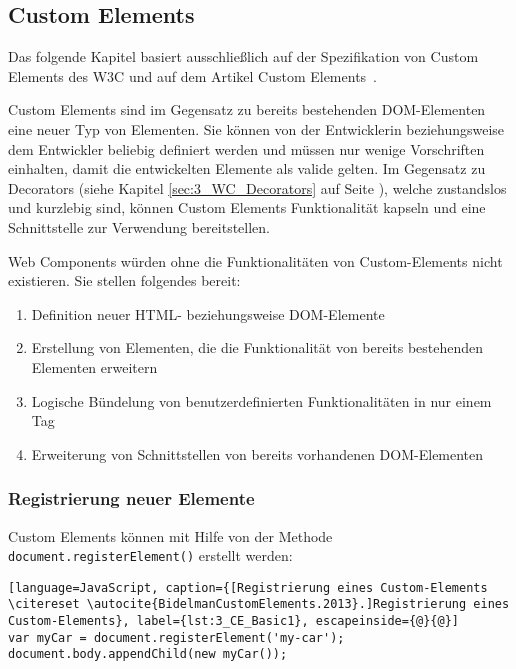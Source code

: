 \subsection{Custom Elements}
\label{sec:3_WC_Elements}

Das folgende Kapitel basiert ausschließlich auf der Spezifikation von Custom Elements des W3C \citereset \autocite[siehe][]{Glakov.2013} und auf dem Artikel \glqq Custom Elements\grqq\ \citereset \autocite[siehe][]{BidelmanCustomElements.2013}.

Custom Elements sind im Gegensatz zu bereits bestehenden DOM-Elementen eine neuer Typ von Elementen. Sie können von der Entwicklerin beziehungsweise dem Entwickler beliebig definiert werden und müssen nur wenige Vorschriften einhalten, damit die entwickelten Elemente als valide gelten. Im Gegensatz zu Decorators (siehe Kapitel \ref{sec:3_WC_Decorators} auf Seite \pageref{sec:3_WC_Decorators}), welche zustandslos und kurzlebig sind, können Custom Elements Funktionalität kapseln und eine Schnittstelle zur Verwendung bereitstellen.

Web Components würden ohne die Funktionalitäten von Custom-Elements nicht existieren. Sie stellen folgendes bereit:
\begin{enumerate}
\item Definition neuer HTML- beziehungsweise DOM-Elemente
\item Erstellung von Elementen, die die Funktionalität von bereits bestehenden Elementen erweitern
\item Logische Bündelung von benutzerdefinierten Funktionalitäten in nur einem Tag
\item Erweiterung von Schnittstellen von bereits vorhandenen DOM-Elementen
\end{enumerate}

\subsubsection{Registrierung neuer Elemente}
\label{sec:3_WC_Elements_Registrierung}

Custom Elements können mit Hilfe von der Methode \lstinline|document.registerElement()| erstellt werden:

\begin{lstlisting}[language=JavaScript, caption={[Registrierung eines Custom-Elements \citereset \autocite{BidelmanCustomElements.2013}.]Registrierung eines Custom-Elements}, label={lst:3_CE_Basic1}, escapeinside={@}{@}]
var myCar = document.registerElement('my-car');
document.body.appendChild(new myCar());
\end{lstlisting}

